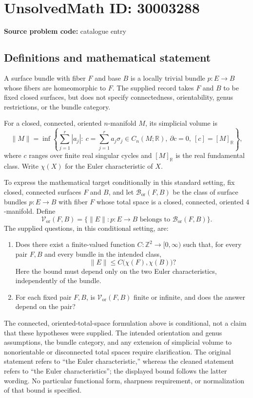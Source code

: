 \documentclass[11pt]{article}
\newcommand{\Z}{\mathbb{Z}}
\newcommand{\R}{\mathbb{R}}
\begin{document}
\section*{UnsolvedMath ID: 30003288}
\textbf{Source problem code:} catalogue entry
\subsection{Definitions and mathematical statement}
A surface bundle with fiber \(F\) and base \(B\) is a locally trivial bundle \(p\colon E\to B\) whose fibers are homeomorphic to \(F\). The supplied record takes \(F\) and \(B\) to be fixed closed surfaces, but does not specify connectedness, orientability, genus restrictions, or the bundle category.

For a closed, connected, oriented \(n\)-manifold \(M\), its simplicial volume is
\[
\|M\|=\inf\left\{\sum_{j=1}^{r}|a_j|:\ c=\sum_{j=1}^{r}a_j\sigma_j\in C_n(M;\R),\ \partial c=0,\ [c]=[M]_{\R}\right\},
\]
where \(c\) ranges over finite real singular cycles and \([M]_{\R}\) is the real fundamental class. Write \(\chi(X)\) for the Euler characteristic of \(X\).

To express the mathematical target conditionally in this standard setting, fix closed, connected surfaces \(F\) and \(B\), and let \(\mathcal B_{\mathrm{or}}(F,B)\) be the class of surface bundles \(p\colon E\to B\) with fiber \(F\) whose total space is a closed, connected, oriented \(4\)-manifold. Define
\[
\mathcal V_{\mathrm{or}}(F,B)=\{\|E\|:p\colon E\to B\text{ belongs to }\mathcal B_{\mathrm{or}}(F,B)\}.
\]
The supplied questions, in this conditional setting, are:
\begin{enumerate}
\item Does there exist a finite-valued function \(C\colon\Z^2\to[0,\infty)\) such that, for every pair \(F,B\) and every bundle in the intended class,
\[
\|E\|\le C\bigl(\chi(F),\chi(B)\bigr)?
\]
Here the bound must depend only on the two Euler characteristics, independently of the bundle.
\item For each fixed pair \(F,B\), is \(\mathcal V_{\mathrm{or}}(F,B)\) finite or infinite, and does the answer depend on the pair?
\end{enumerate}
The connected, oriented-total-space formulation above is conditional, not a claim that these hypotheses were supplied. The intended orientation and genus assumptions, the bundle category, and any extension of simplicial volume to nonorientable or disconnected total spaces require clarification. The original statement refers to ``the Euler characteristic,'' whereas the cleaned statement refers to ``the Euler characteristics''; the displayed bound follows the latter wording. No particular functional form, sharpness requirement, or normalization of that bound is specified.
\end{document}
